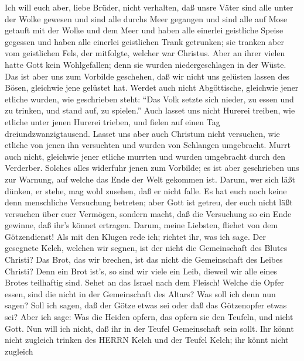  Ich will euch aber, liebe Brüder, nicht verhalten, daß
unsre Väter sind alle unter der Wolke gewesen und sind alle durchs Meer
gegangen  und sind alle auf Mose getauft mit der Wolke und
dem Meer  und haben alle einerlei geistliche Speise gegessen
 und haben alle einerlei geistlichen Trank getrunken; sie
tranken aber vom geistlichen Fels, der mitfolgte, welcher war Christus.
 Aber an ihrer vielen hatte Gott kein Wohlgefallen; denn sie
wurden niedergeschlagen in der Wüste.  Das ist aber uns zum
Vorbilde geschehen, daß wir nicht uns gelüsten lassen des Bösen,
gleichwie jene gelüstet hat.  Werdet auch nicht Abgöttische,
gleichwie jener etliche wurden, wie geschrieben steht: ``Das Volk setzte
sich nieder, zu essen und zu trinken, und stand auf, zu spielen.''
 Auch lasset uns nicht Hurerei treiben, wie etliche unter
jenen Hurerei trieben, und fielen auf einen Tag dreiundzwanzigtausend.
 Lasset uns aber auch Christum nicht versuchen, wie etliche
von jenen ihn versuchten und wurden von Schlangen umgebracht.
 Murrt auch nicht, gleichwie jener etliche murrten und
wurden umgebracht durch den Verderber.  Solches alles
widerfuhr jenen zum Vorbilde; es ist aber geschrieben uns zur Warnung,
auf welche das Ende der Welt gekommen ist.  Darum, wer sich
läßt dünken, er stehe, mag wohl zusehen, daß er nicht falle.
 Es hat euch noch keine denn menschliche Versuchung
betreten; aber Gott ist getreu, der euch nicht läßt versuchen über euer
Vermögen, sondern macht, daß die Versuchung so ein Ende gewinne, daß
ihr's könnet ertragen.  Darum, meine Liebsten, fliehet von
dem Götzendienst!  Als mit den Klugen rede ich; richtet
ihr, was ich sage.  Der gesegnete Kelch, welchen wir
segnen, ist der nicht die Gemeinschaft des Blutes Christi? Das Brot, das
wir brechen, ist das nicht die Gemeinschaft des Leibes Christi?
 Denn ein Brot ist's, so sind wir viele ein Leib, dieweil
wir alle eines Brotes teilhaftig sind.  Sehet an das Israel
nach dem Fleisch! Welche die Opfer essen, sind die nicht in der
Gemeinschaft des Altars?  Was soll ich denn nun sagen? Soll
ich sagen, daß der Götze etwas sei oder daß das Götzenopfer etwas sei?
 Aber ich sage: Was die Heiden opfern, das opfern sie den
Teufeln, und nicht Gott. Nun will ich nicht, daß ihr in der Teufel
Gemeinschaft sein sollt.  Ihr könnt nicht zugleich trinken
des HERRN Kelch und der Teufel Kelch; ihr könnt nicht zugleich

